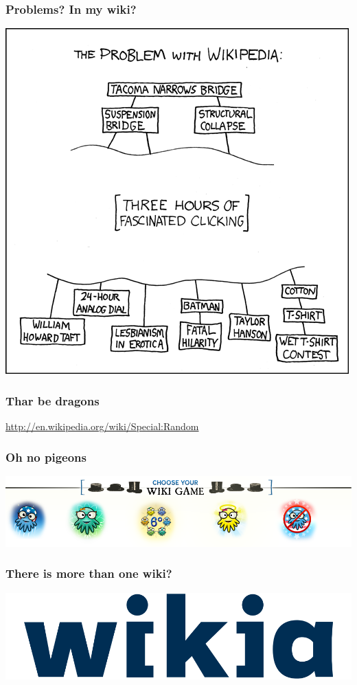 \documentclass{beamer}
\begin{document}
\begin{frame}
  \frametitle{Problems? In my wiki?}
  \begin{center}
    \includegraphics[height = 0.8\textheight, keepaspectratio = true]{figure/the_problem_with_wikipedia}
  \end{center}
\end{frame}

\begin{frame}
  \frametitle{Thar be dragons}

  \url{http://en.wikipedia.org/wiki/Special:Random}
\end{frame}

\begin{frame}
  \frametitle{Oh no pigeons}
  \begin{center}
    \includegraphics[width = \textwidth, keepaspectratio = true]{figure/wiki_game}
  \end{center}
\end{frame}

\begin{frame}
  \frametitle{There is more than one wiki?}
  \begin{center}
    \includegraphics[width = \textwidth, keepaspectratio = true]{figure/wikia}
  \end{center}
\end{frame}
\end{document}
